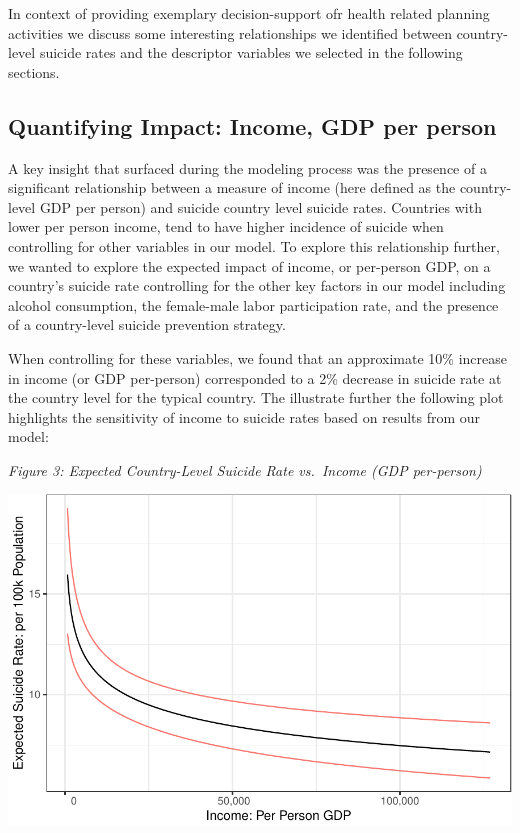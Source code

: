 \documentclass[]{article}
\begin{document}
In context of providing exemplary decision-support ofr health related
planning activities we discuss some interesting relationships we
identified between country-level suicide rates and the descriptor
variables we selected in the following sections.

\subsection{Quantifying Impact: Income, GDP per
person}\label{quantifying-impact-income-gdp-per-person}

A key insight that surfaced during the modeling process was the presence
of a significant relationship between a measure of income (here defined
as the country-level GDP per person) and suicide country level suicide
rates. Countries with lower per person income, tend to have higher
incidence of suicide when controlling for other variables in our model.
To explore this relationship further, we wanted to explore the expected
impact of income, or per-person GDP, on a country's suicide rate
controlling for the other key factors in our model including alcohol
consumption, the female-male labor participation rate, and the presence
of a country-level suicide prevention strategy.

When controlling for these variables, we found that an approximate 10\%
increase in income (or GDP per-person) corresponded to a 2\% decrease in
suicide rate at the country level for the typical country. The
illustrate further the following plot highlights the sensitivity of
income to suicide rates based on results from our model:

\emph{Figure 3: Expected Country-Level Suicide Rate vs.~Income (GDP
per-person)}

\begin{center}\includegraphics{Project_Report_files/figure-latex/agdp_plot-1} \end{center}
\end{document}
